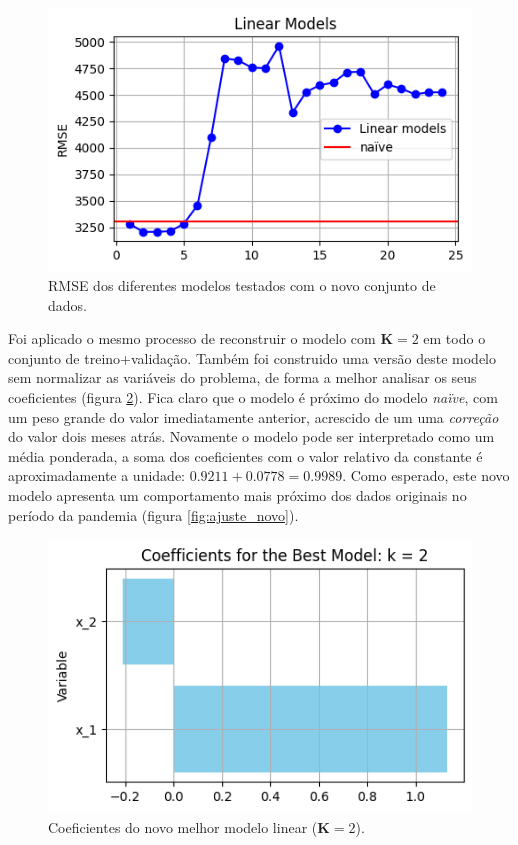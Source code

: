 \documentclass[final,5p]{elsarticle}
\numberwithin{equation}{section}
\begin{document}
        \begin{figure}[hbt!]
            \includegraphics[width=0.95\columnwidth]{C1_LinearModels.png}
            \caption{RMSE dos diferentes modelos testados com o novo conjunto de dados.}
            \label{fig:modelos_lineares_novo}
        \end{figure}

        Foi aplicado o mesmo processo de reconstruir o modelo com $\textbf{K} = 2$ em todo o conjunto de treino+validação. Também foi construido uma versão deste modelo sem normalizar as variáveis do problema, de forma a melhor analisar os seus coeficientes (figura \ref{fig:coeficientes_novo}). Fica claro que o modelo é próximo do modelo \emph{naïve}, com um peso grande do valor imediatamente anterior, acrescido de um uma \emph{correção} do valor dois meses atrás. Novamente o modelo pode ser interpretado como um média ponderada, a soma dos coeficientes com o valor relativo da constante é aproximadamente a unidade: $ 0.9211 + 0.0778 = 0.9989$. Como esperado, este novo modelo apresenta um comportamento mais próximo dos dados originais no período da pandemia (figura \ref{fig:ajuste_novo}).

        \begin{figure}[hbt!]
            \includegraphics[width=0.95\columnwidth]{C1_CoefficientsNoScaling.png}
            \caption{Coeficientes do novo melhor modelo linear ($\textbf{K} = 2$).}
            \label{fig:coeficientes_novo}
        \end{figure}
\end{document}
